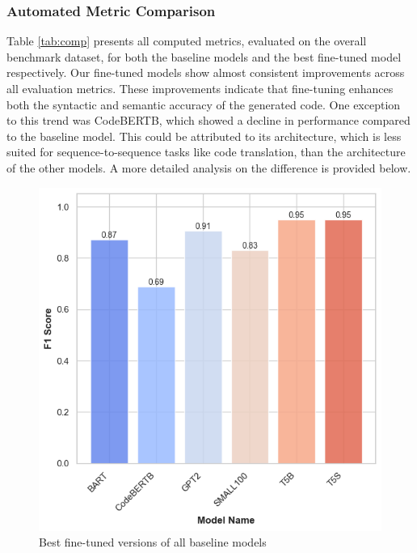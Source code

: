 \documentclass[conference]{IEEEtran}
\begin{document}
\subsubsection{Automated Metric Comparison}
Table \ref{tab:comp} presents all computed metrics, evaluated on the overall benchmark dataset, for both the baseline models and the best fine-tuned model respectively. Our fine-tuned models show almost consistent improvements across all evaluation metrics. These improvements indicate that fine-tuning enhances both the syntactic and semantic accuracy of the generated code. One exception to this trend was CodeBERTB, which showed a decline in performance compared to the baseline model. This could be attributed to its architecture, which is less suited for sequence-to-sequence tasks like code translation, than the architecture of  the other models. A more detailed analysis on the difference is provided below.
    \begin{figure}[htbp]
\centerline{\includegraphics[width=\columnwidth]{images/final.png}}
\caption{Best fine-tuned versions of all baseline models}
\label{overall}
\end{figure}
\end{document}
